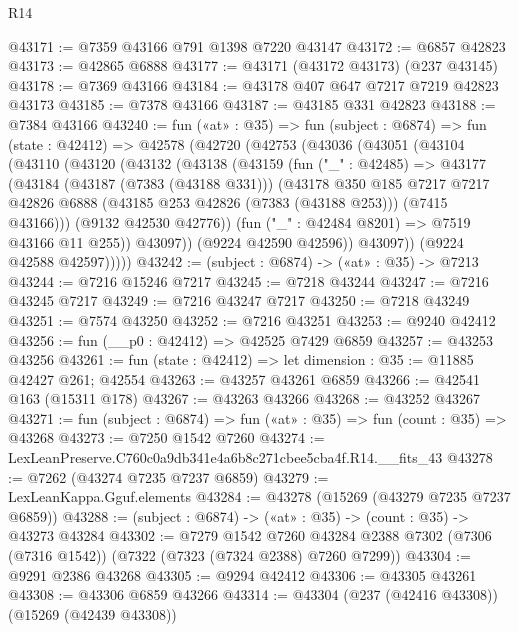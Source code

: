 \begin{lexlean}{R14}
\begin{coremodule}
@43171 := @7359 @43166 @791 @1398 @7220 @43147
@43172 := @6857 @42823
@43173 := @42865 @6888
@43177 := @43171 (@43172 @43173) (@237 @43145)
@43178 := @7369 @43166
@43184 := @43178 @407 @647 @7217 @7219 @42823 @43173
@43185 := @7378 @43166
@43187 := @43185 @331 @42823
@43188 := @7384 @43166
@43240 := fun («at» : @35) =>
  fun (subject : @6874) =>
  fun (state : @42412) =>
  @42578
    (@42720
      (@42753
        (@43036
          (@43051
            (@43104
              (@43110
                (@43120
                  (@43132
                    (@43138
                      (@43159
                        (fun ("_" : @42485) =>
                        @43177
                          (@43184
                            (@43187 (@7383 (@43188 @331)))
                            (@43178
                              @350
                              @185
                              @7217
                              @7217
                              @42826
                              @6888
                              (@43185 @253 @42826 (@7383 (@43188 @253)))
                              (@7415 @43166)))
                          (@9132 @42530 @42776))
                        (fun ("_" : @42484 @8201) => @7519 @43166 @11 @255))
                      @43097))
                  (@9224 @42590 @42596))
                @43097))
            (@9224 @42588 @42597)))))
@43242 := (subject : @6874) -> («at» : @35) -> @7213
@43244 := @7216 @15246 @7217
@43245 := @7218 @43244
@43247 := @7216 @43245 @7217
@43249 := @7216 @43247 @7217
@43250 := @7218 @43249
@43251 := @7574 @43250
@43252 := @7216 @43251
@43253 := @9240 @42412
@43256 := fun (__p0 : @42412) => @42525 @7429 @6859
@43257 := @43253 @43256
@43261 := fun (state : @42412) => let dimension : @35 := @11885 @42427 @261; @42554
@43263 := @43257 @43261 @6859
@43266 := @42541 @163 (@15311 @178)
@43267 := @43263 @43266
@43268 := @43252 @43267
@43271 := fun (subject : @6874) => fun («at» : @35) => fun (count : @35) => @43268
@43273 := @7250 @1542 @7260
@43274 := LexLeanPreserve.C760c0a9db341e4a6b8c271cbee5cba4f.R14.__fits_43
@43278 := @7262 (@43274 @7235 @7237 @6859)
@43279 := LexLeanKappa.Gguf.elements
@43284 := @43278 (@15269 (@43279 @7235 @7237 @6859))
@43288 := (subject : @6874) -> («at» : @35) -> (count : @35) -> @43273 @43284
@43302 := @7279
    @1542
    @7260
    @43284
    @2388
    @7302
    (@7306 (@7316 @1542))
    (@7322 (@7323 (@7324 @2388) @7260 @7299))
@43304 := @9291 @2386 @43268
@43305 := @9294 @42412
@43306 := @43305 @43261
@43308 := @43306 @6859 @43266
@43314 := @43304 (@237 (@42416 @43308)) (@15269 (@42439 @43308))

\end{coremodule}
\end{lexlean}

